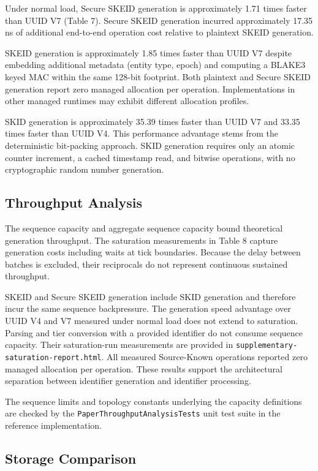 \documentclass[fleqn,10pt]{wlpeerj}
\begin{document}
Under normal load, Secure SKEID generation is approximately 1.71 times
faster than UUID V7 (Table 7). Secure SKEID generation incurred
approximately 17.35 ns of additional end-to-end operation cost relative
to plaintext SKEID generation.

SKEID generation is approximately 1.85 times faster than UUID V7 despite
embedding additional metadata (entity type, epoch) and computing a
BLAKE3 keyed MAC within the same 128-bit footprint. Both plaintext and
Secure SKEID generation report zero managed allocation per operation.
Implementations in other managed runtimes may exhibit different
allocation profiles.

SKID generation is approximately 35.39 times faster than UUID V7 and
33.35 times faster than UUID V4. This performance advantage stems from
the deterministic bit-packing approach. SKID generation requires only an
atomic counter increment, a cached timestamp read, and bitwise
operations, with no cryptographic random number generation.

\subsection{Throughput Analysis}\label{throughput-analysis}

The sequence capacity and aggregate sequence capacity bound theoretical
generation throughput. The saturation measurements in Table 8 capture
generation costs including waits at tick boundaries. Because the delay
between batches is excluded, their reciprocals do not represent
continuous sustained throughput.

SKEID and Secure SKEID generation include SKID generation and therefore
incur the same sequence backpressure. The generation speed advantage
over UUID V4 and V7 measured under normal load does not extend to
saturation. Parsing and tier conversion with a provided identifier do
not consume sequence capacity. Their saturation-run measurements are
provided in \texttt{supplementary-saturation-report.html}. All measured
Source-Known operations reported zero managed allocation per operation.
These results support the architectural separation between identifier
generation and identifier processing.

The sequence limits and topology constants underlying the capacity
definitions are checked by the \texttt{PaperThroughputAnalysisTests}
unit test suite in the reference implementation.

\subsection{Storage Comparison}\label{storage-comparison}
\end{document}
